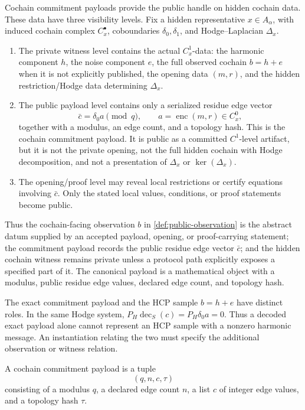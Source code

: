 Cochain commitment payloads provide the public handle on hidden cochain data.
These data have three visibility levels. Fix a hidden
representative \(x\in A_\alpha\), with induced cochain complex \(C_x^\bullet\),
coboundaries \(\delta_0,\delta_1\), and Hodge--Laplacian \(\Delta_x\).
\begin{enumerate}[label=(\roman*)]
  \item The private witness level contains the actual \(C_x^1\)-data:
    the harmonic component \(h\), the noise component \(e\), the full observed
    cochain \(b=h+e\) when it is not explicitly published, the opening data
    \((m,r)\), and the hidden restriction/Hodge data determining
    \(\Delta_x\).
  \item The public payload level contains only a serialized residue edge vector
    \[
      \bar c=\delta_0 a\pmod q,
      \qquad a=\operatorname{enc}(m,r)\in C_x^0,
    \]
    together with a modulus, an edge count, and a topology hash. This is the
    cochain commitment payload. It is public as a committed \(C^1\)-level
    artifact, but it is not the private opening, not the full hidden cochain
    with Hodge decomposition, and not a presentation of \(\Delta_x\) or
    \(\ker(\Delta_x)\).
  \item The opening/proof level may reveal local restrictions or certify
    equations involving \(\bar c\). Only the stated local values, conditions,
    or proof statements become public.
\end{enumerate}
Thus the cochain-facing observation \(b\) in \cref{def:public-observation} is
the abstract datum supplied by an accepted payload, opening, or proof-carrying
statement; the commitment payload records the public residue edge vector
\(\bar c\); and the hidden cochain witness remains private unless a protocol
path explicitly exposes a specified part of it. The canonical payload is a
mathematical object with a modulus, public residue edge values, declared edge
count, and topology hash.

The exact commitment payload and the HCP sample \(b=h+e\) have distinct
roles. In the same Hodge system,
\(P_H\operatorname{dec}_S(c)=P_H\delta_0a=0\). Thus a decoded exact payload
alone cannot represent an HCP sample with a nonzero harmonic message. An
instantiation relating the two must specify the additional observation or
witness relation.

\begin{definition}\label{def:cochain-commitment-payload}
  A cochain commitment payload is a tuple
  \[
    (q,n,c,\tau)
  \]
  consisting of a modulus \(q\), a declared edge count \(n\), a list \(c\) of
  integer edge values, and a topology hash \(\tau\).
\end{definition}

